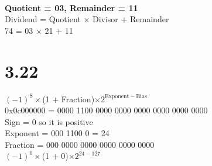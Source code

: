\documentclass[12pt]{article}
\begin{document}
\\
\textbf{Quotient = 03, Remainder = 11}\\
Dividend = Quotient $\times$ Divisor + Remainder\\
74 = 03 $\times$ 21 + 11\\

\section*{3.22}
$(-1)^{\mathrm{S}}\times$(1 + Fraction)$\times2^{\mathrm{Exponent - Bias}}$\\
0x0c000000 = 0000 1100 0000 0000 0000 0000 0000 0000\\
Sign = 0 so it is positive\\
Exponent = 000 1100 0 = 24\\
Fraction = 000 0000 0000 0000 0000 0000\\
$(-1)^{\mathrm{0}}\times$(1 + 0)$\times2^{\mathrm{24 - 127}}$\\
\end{document}
